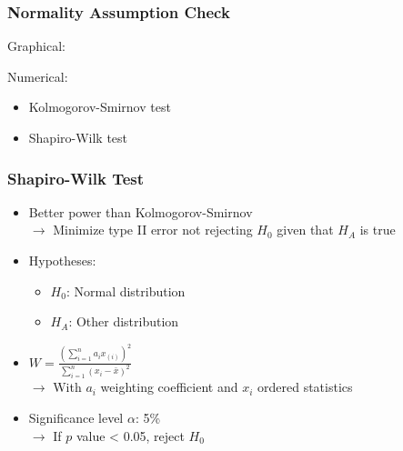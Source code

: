 \documentclass[xcolor=table]{beamer}
\begin{document}
\begin{frame}
	\frametitle{Normality Assumption Check}
	Graphical:\\
	\begin{figure}
		\captionsetup[subfigure]{labelformat=empty}
		\qquad
		\qquad
	\end{figure}
	Numerical:
	\begin{itemize}[label=$\bullet$]
		\item Kolmogorov-Smirnov test
		\item Shapiro-Wilk test
	\end{itemize}
\end{frame}


\begin{frame}
	\frametitle{Shapiro-Wilk Test}
	\begin{itemize}[label=$\bullet$]
		\item Better power than Kolmogorov-Smirnov \cite{p7}\\
		$ \rightarrow $ Minimize type II error not rejecting $H_0$ given that $H_A$ is true
		\item Hypotheses:
		\begin{itemize}[label=$-$]
			\item $H_0$: Normal distribution
			\item $H_A$: Other distribution
		\end{itemize}
		\item $W = \frac{(\sum_{i=1}^n a_i x_{(i)})^2}{\sum_{i=1}^n (x_i - \bar{x})^2}$\\\vspace{2mm}
		$ \rightarrow $ With $a_i$ weighting coefficient and $x_i$ ordered statistics
		\item Significance level $\alpha$: 5\%\\
		$ \rightarrow $ If $p$ value < 0.05, reject $H_0$
	\end{itemize}
\end{frame}

\end{document}
